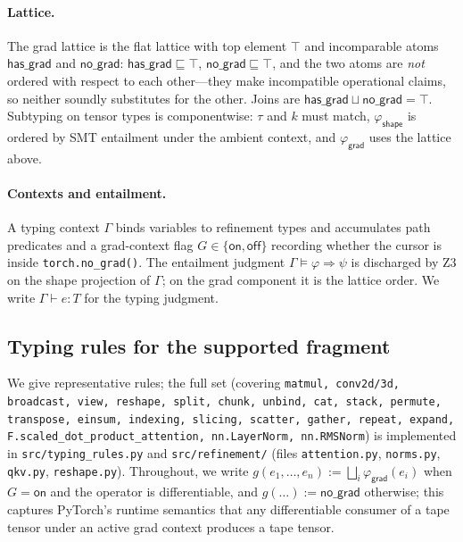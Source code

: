 \paragraph{Lattice.} The grad lattice is the flat lattice with
top element $\top$ and incomparable atoms
$\mathsf{has\_grad}$ and $\mathsf{no\_grad}$:
$\mathsf{has\_grad}\sqsubseteq\top$,
$\mathsf{no\_grad}\sqsubseteq\top$, and the two atoms are
\emph{not} ordered with respect to each other---they make
incompatible operational claims, so neither soundly substitutes
for the other. Joins are
$\mathsf{has\_grad}\sqcup\mathsf{no\_grad}=\top$. Subtyping on
tensor types is componentwise: $\tau$ and $k$ must match,
$\varphi_{\mathsf{shape}}$ is ordered by SMT entailment under the
ambient context, and $\varphi_{\mathsf{grad}}$ uses the lattice
above.

\paragraph{Contexts and entailment.} A typing context $\Gamma$
binds variables to refinement types and accumulates path
predicates and a grad-context flag $G\in\{\mathsf{on},\mathsf{off}\}$
recording whether the cursor is inside
\texttt{torch.no\_grad()}. The entailment judgment
$\Gamma\models\varphi\Rightarrow\psi$ is discharged by Z3 on the
shape projection of $\Gamma$; on the grad component it is the
lattice order. We write $\Gamma\vdash e:T$ for the typing
judgment.

\subsection{Typing rules for the supported fragment}
\label{sec:rt:rules}

We give representative rules; the full set (covering
\texttt{matmul, conv2d/3d, broadcast, view, reshape, split,
chunk, unbind, cat, stack, permute, transpose, einsum, indexing,
slicing, scatter, gather, repeat, expand,
F.scaled\_dot\_product\_attention, nn.LayerNorm, nn.RMSNorm}) is
implemented in \texttt{src/typing\_rules.py} and
\texttt{src/refinement/} (files \texttt{attention.py},
\texttt{norms.py}, \texttt{qkv.py}, \texttt{reshape.py}). Throughout,
we write $g(e_1,\dots,e_n) := \bigsqcup_i\varphi_{\mathsf{grad}}(e_i)$
when $G=\mathsf{on}$ and the operator is differentiable, and
$g(\dots):=\mathsf{no\_grad}$ otherwise; this captures PyTorch's
runtime semantics that any differentiable consumer of a tape
tensor under an active grad context produces a tape tensor.

